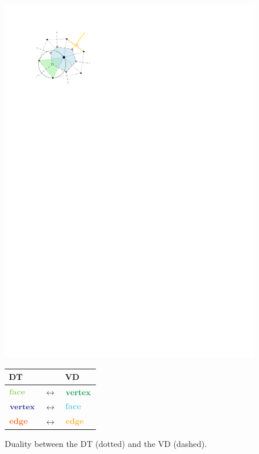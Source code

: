 \begin{figure}[h]
\centering
\begin{minipage}[c]{0.4\textwidth}
  \includegraphics[width=\textwidth]{figs/dualdetail.pdf}
\end{minipage}
\begin{minipage}[c]{0.45\textwidth}
  \centering
  \begin{tabular}{lcl}
  \toprule
  DT & & VD \\
  \midrule
  $\mathbf{\color{YellowGreen}{face}}$ & $\leftrightarrow$ & $\mathbf{\color{ForestGreen}{vertex}}$\\
  $\mathbf{\color{Blue}{vertex}}$ & $\leftrightarrow$ & $\mathbf{\color{SkyBlue}{face}}$\\
  $\mathbf{\color{Orange}{edge}}$ & $\leftrightarrow$ & $\mathbf{\color{Dandelion}{edge}}$\\
  \bottomrule
  \end{tabular}
\end{minipage}
\caption{Duality between the DT (dotted) and the VD (dashed).}
\label{fig:dualdetailtab}
\end{figure}


